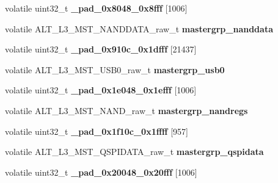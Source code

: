 \begin{DoxyCompactItemize}
volatile uint32\+\_\+t {\bfseries \+\_\+pad\+\_\+0x8048\+\_\+0x8fff} \mbox{[}1006\mbox{]}
\item 
\mbox{\label{structALT__L3__MSTGRP__raw__s_acf92ce7f2b2f68102238570c812d4e14}} 
volatile A\+L\+T\+\_\+\+L3\+\_\+\+M\+S\+T\+\_\+\+N\+A\+N\+D\+D\+A\+T\+A\+\_\+raw\+\_\+t {\bfseries mastergrp\+\_\+nanddata}
\item 
\mbox{\label{structALT__L3__MSTGRP__raw__s_a84757ed48966a9d55d06558640e09242}} 
volatile uint32\+\_\+t {\bfseries \+\_\+pad\+\_\+0x910c\+\_\+0x1dfff} \mbox{[}21437\mbox{]}
\item 
\mbox{\label{structALT__L3__MSTGRP__raw__s_abe1b3cdd2949a1b8fae0aa397cc438c0}} 
volatile A\+L\+T\+\_\+\+L3\+\_\+\+M\+S\+T\+\_\+\+U\+S\+B0\+\_\+raw\+\_\+t {\bfseries mastergrp\+\_\+usb0}
\item 
\mbox{\label{structALT__L3__MSTGRP__raw__s_a73b35a78884130e13b40dcc5837f6d92}} 
volatile uint32\+\_\+t {\bfseries \+\_\+pad\+\_\+0x1e048\+\_\+0x1efff} \mbox{[}1006\mbox{]}
\item 
\mbox{\label{structALT__L3__MSTGRP__raw__s_aed12af7c0c25a480c261d5d4379a5fe9}} 
volatile A\+L\+T\+\_\+\+L3\+\_\+\+M\+S\+T\+\_\+\+N\+A\+N\+D\+\_\+raw\+\_\+t {\bfseries mastergrp\+\_\+nandregs}
\item 
\mbox{\label{structALT__L3__MSTGRP__raw__s_a045cc376ccc8174f0f5957927923be1f}} 
volatile uint32\+\_\+t {\bfseries \+\_\+pad\+\_\+0x1f10c\+\_\+0x1ffff} \mbox{[}957\mbox{]}
\item 
\mbox{\label{structALT__L3__MSTGRP__raw__s_af106e79ff49bcc89a75ac161bd830895}} 
volatile A\+L\+T\+\_\+\+L3\+\_\+\+M\+S\+T\+\_\+\+Q\+S\+P\+I\+D\+A\+T\+A\+\_\+raw\+\_\+t {\bfseries mastergrp\+\_\+qspidata}
\item 
\mbox{\label{structALT__L3__MSTGRP__raw__s_af158c42999847cbbc9d712cb1457a43b}} 
volatile uint32\+\_\+t {\bfseries \+\_\+pad\+\_\+0x20048\+\_\+0x20fff} \mbox{[}1006\mbox{]}
\item 

\end{DoxyCompactItemize}

